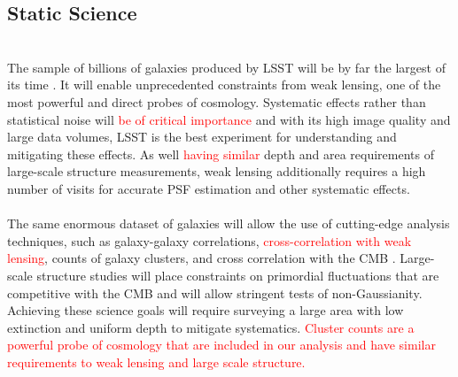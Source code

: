 \documentclass[12pt, letterpaper]{article}
\newcommand{\review}[1]{{\textcolor{red}{#1}}}
\begin{document}
\subsection{Static Science}

\hspace{\parindent}{\bf Weak Lensing}\\
The sample of billions of galaxies produced by LSST will be by far the largest of its time \cite{lsst2009}. It will enable unprecedented constraints from weak lensing, one of the most powerful and direct probes of cosmology. Systematic effects rather than statistical noise will \review{be of critical importance} and with its high image quality and large data volumes, LSST is the best experiment for understanding and mitigating these effects. As well \review{having similar} depth and area requirements of large-scale structure measurements, weak lensing additionally requires a high number of visits for accurate PSF estimation and other systematic effects.\\

\hspace{\parindent}{\bf Large-Scale Structure and Galaxy Clusters}\\
 The same enormous dataset of galaxies will allow the use of cutting-edge analysis techniques, such as galaxy-galaxy correlations, \review{cross-correlation with weak lensing}, counts of galaxy clusters, and cross correlation with the CMB \cite{lsst2009}. Large-scale structure studies will place constraints on primordial fluctuations that are competitive with the CMB and will allow stringent tests of non-Gaussianity. Achieving these science goals will require surveying a large area with low extinction and uniform depth to mitigate systematics. \review{Cluster counts are a powerful probe of cosmology that are included in our analysis and have similar requirements to weak lensing and large scale structure.} \\
\end{document}
